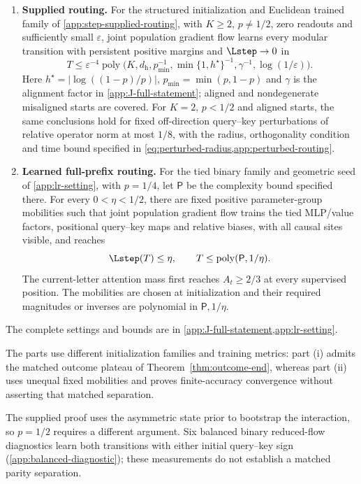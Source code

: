 \begin{theorem}
\label{thm:joint}
\begin{enumerate}[label=(\roman*),leftmargin=*,itemsep=3pt,topsep=3pt]
\item \textbf{Supplied routing.} For the structured initialization and Euclidean
trained family of \cref{app:step-supplied-routing}, with $K\ge2$, $p\ne1/2$,
zero readouts and sufficiently small $\varepsilon$, joint population gradient
flow learns every modular transition with persistent positive margins and
$\Lstep\to0$ in
\[
 T\le\varepsilon^{-4}\operatorname{poly}
 \bigl(K,d_{\mathrm h},p_{\min}^{-1},\min\{1,h^\star\}^{-1},
 \gamma^{-1},\log(1/\varepsilon)\bigr).
\]
Here $h^\star=|\log((1-p)/p)|$, $p_{\min}=\min(p,1-p)$ and $\gamma$
is the alignment factor in \cref{app:J-full-statement}; aligned and
nondegenerate misaligned starts are covered.
For $K=2$, $p<1/2$ and aligned starts, the same conclusions hold for
fixed off-direction query--key perturbations of relative operator norm
at most $1/8$, with the radius, orthogonality condition and time bound
specified in \cref{eq:perturbed-radius,app:perturbed-routing}.

\item \textbf{Learned full-prefix routing.} For the tied binary family and
geometric seed of \cref{app:lr-setting}, with $p=1/4$, let $\mathsf P$ be the
complexity bound specified there. For every $0<\eta<1/2$, there are fixed
positive parameter-group mobilities such that joint population gradient flow
trains the tied MLP/value factors, positional query--key maps and relative
biases, with all causal sites visible, and reaches
\[
 \Lstep(T)\le\eta,\qquad T\le\operatorname{poly}(\mathsf P,1/\eta).
\]
The current-letter attention mass first reaches $A_t\ge2/3$ at every
supervised position. The mobilities are chosen at initialization and their
required magnitudes or inverses are polynomial in $\mathsf P,1/\eta$.
\end{enumerate}
The complete settings and bounds are in \cref{app:J-full-statement,app:lr-setting}.
\end{theorem}

The parts use different initialization families and training metrics:
part (i) admits the matched outcome plateau of Theorem~\ref{thm:outcome-end},
whereas part (ii) uses unequal fixed mobilities and proves finite-accuracy
convergence without asserting that matched separation.

The supplied proof uses the asymmetric state prior to bootstrap the interaction,
so $p=1/2$ requires a different argument. Six balanced binary reduced-flow diagnostics
learn both transitions with either initial query--key sign (\cref{app:balanced-diagnostic});
these measurements do not establish a matched parity separation.

